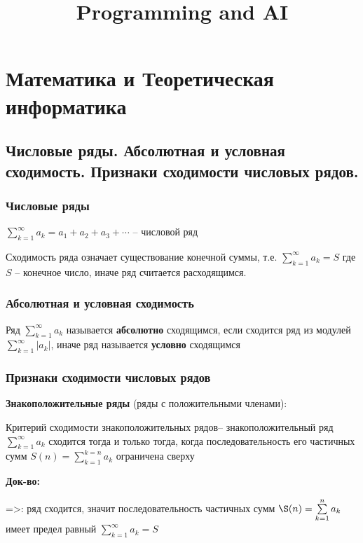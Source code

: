 \documentclass{article}
\title{Programming and AI} %
\begin{document}
	
	\maketitle %
	\section{Математика и Теоретическая информатика}
	
	\subsection{Числовые ряды. Абсолютная и условная сходимость. Признаки сходимости числовых рядов.}
	
	\subsubsection{Числовые ряды}
	
	$\sum\limits_{k=1}^{\infty} a_{k} = a_{1} + a_{2} + a_{3} + \cdots$ -- числовой ряд
	
	Сходимость ряда означает существование конечной суммы, т.е. $\sum\limits_{k=1}^{\infty} a_{k} = S$ где $S$ -- конечное число, иначе ряд считается расходящимся.
	
	\subsubsection{Абсолютная и условная сходимость}
	
	Ряд $\sum\limits_{k=1}^{\infty} a_{k}$ называется {\bf абсолютно} сходящимся, если сходится ряд из модулей $\sum\limits_{k=1}^{\infty} |a_{k}|$, иначе ряд называется {\bf условно} сходящимся
	
	\subsubsection{Признаки сходимости числовых рядов} 
	
	{\bf Знакоположительные ряды} (ряды с положительными членами):
	
	Критерий сходимости знакоположительных рядов-- знакоположительный ряд $\sum\limits_{k=1}^{\infty} a_{k}$ сходится тогда и только тогда, когда последовательность его частичных сумм $S(n) = \sum\limits_{k=1}^{k=n}a_{k}$ ограничена сверху
	
	{\bf Док-во:}
	
	=>: ряд сходится, значит последовательность частичных сумм $\S(n) =\sum\limits_{k=1}^{n} a_{k}$ имеет предел равный $\sum\limits_{k=1}^{\infty} a_{k} = S$
	
\end{document}
